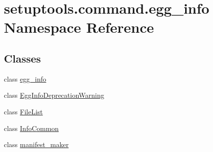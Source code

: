 \hypertarget{namespacesetuptools_1_1command_1_1egg__info}{}\section{setuptools.\+command.\+egg\+\_\+info Namespace Reference}
\label{namespacesetuptools_1_1command_1_1egg__info}
\subsection*{Classes}
\begin{DoxyCompactItemize}
\item 
class \hyperlink{classsetuptools_1_1command_1_1egg__info_1_1egg__info}{egg\+\_\+info}
\item 
class \hyperlink{classsetuptools_1_1command_1_1egg__info_1_1EggInfoDeprecationWarning}{Egg\+Info\+Deprecation\+Warning}
\item 
class \hyperlink{classsetuptools_1_1command_1_1egg__info_1_1FileList}{File\+List}
\item 
class \hyperlink{classsetuptools_1_1command_1_1egg__info_1_1InfoCommon}{Info\+Common}
\item 
class \hyperlink{classsetuptools_1_1command_1_1egg__info_1_1manifest__maker}{manifest\+\_\+maker}
\end{DoxyCompactItemize}
